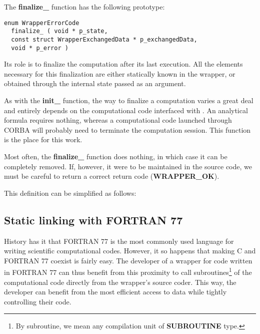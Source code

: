 The {\bf finalize\_} function has the following prototype:

\lstset{language=C++, basicstyle=\normalsize}
\begin{lstlisting}[frame=TBRL]
  enum WrapperErrorCode
  finalize_ ( void * p_state,
  const struct WrapperExchangedData * p_exchangedData,
  void * p_error )
\end{lstlisting}

Its role is to finalize the computation after its last execution. All the elements necessary for this finalization are either statically known in the wrapper, or obtained through the internal state passed as an argument.

As with the {\bf init\_} function, the way to finalize a computation varies a great deal and entirely depends on the computational code interfaced with \OT . An analytical formula requires nothing, whereas a computational code launched through CORBA will probably need to terminate the computation session. This function is the place for this work.

Most often, the {\bf finalize\_} function does nothing, in which case it can be completely removed. If, however, it were to be maintained in the source code, we must be careful to return a correct return code ({\bf WRAPPER\_OK}).

This definition can be simplified as follows:

\subsection{Static linking with FORTRAN 77}

History has it that FORTRAN 77 is the most commonly used language for writing scientific computational codes. However, it so happens that making C and FORTRAN 77 coexist is fairly easy. The developer of a wrapper for code written in FORTRAN 77 can thus benefit from this proximity to call subroutines\footnote{By subroutine, we mean any compilation unit of {\bf SUBROUTINE} type.} of the computational code directly from the wrapper's source coder. This way, the developer can benefit from the most efficient access to data while tightly controlling their code.

